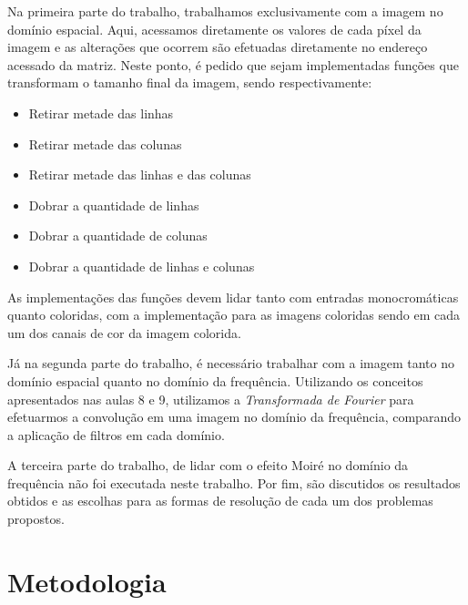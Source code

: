 \documentclass[conference]{IEEEtran}
\begin{document}
Na primeira parte do trabalho, trabalhamos exclusivamente com a imagem no domínio espacial. Aqui, acessamos diretamente os valores de cada píxel da imagem e as alterações que ocorrem são efetuadas diretamente no endereço acessado da matriz.
Neste ponto, é pedido que sejam implementadas funções que transformam o tamanho final da imagem, sendo respectivamente:
\begin{itemize}
    \item Retirar metade das linhas
    \item Retirar metade das colunas
    \item Retirar metade das linhas e das colunas
    \item Dobrar a quantidade de linhas
    \item Dobrar a quantidade de colunas
    \item Dobrar a quantidade de linhas e colunas
\end{itemize}
As implementações das funções devem lidar tanto com entradas monocromáticas quanto coloridas, com a implementação para as imagens coloridas sendo em cada um dos canais de cor da imagem colorida.

Já na segunda parte do trabalho, é necessário trabalhar com a imagem tanto no domínio espacial quanto no domínio da frequência. Utilizando os conceitos apresentados nas aulas 8\cite{macchiavello_dominio_nodate} e 9\cite{macchiavello_dominio_2026}, 
utilizamos a \textit{Transformada de Fourier} para efetuarmos a convolução em uma imagem no domínio da frequência, comparando a aplicação de filtros em cada domínio.

A terceira parte do trabalho, de lidar com o efeito Moiré no domínio da frequência não foi executada neste trabalho.
Por fim, são discutidos os resultados obtidos e as escolhas para as formas de resolução de cada um dos problemas propostos.

\section{Metodologia}
\end{document}
